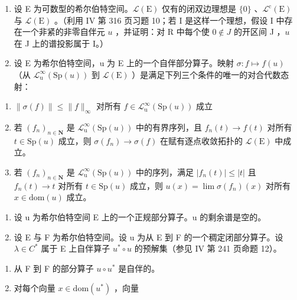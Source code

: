 \begin{enumerate}
\def\labelenumi{\arabic{enumi})}
\setcounter{enumi}{2}
\item
  设 E 为可数型的希尔伯特空间。\(\mathcal{L}(\mathrm{E})\) 仅有的闭双边理想是 \(\{0\}\) 、\(\mathcal{L}^{\mathrm{c}}(\mathrm{E})\) 与 \(\mathcal{L}(\mathrm{E})\) 。（利用 IV 第 316 页习题 10；若 I 是这样一个理想，假设 I 中存在一个非紧的非零自伴元 \(u\) ，并证明：对 R 中每个使 \(0 \notin J\) 的开区间 J ，\(u\) 在 J 上的谱投影属于 I。）
\item
  设 E 为希尔伯特空间，u 为 E 上的一个自伴部分算子。映射 \(\sigma\colon f\mapsto f(u)\) （从 \(\mathcal{L}_{\mathrm{u}}^{\infty}(\mathrm{Sp}(u))\) 到 \(\mathcal{L}(\mathrm{E})\) ）是满足下列三个条件的唯一的对合代数态射：
\end{enumerate}

\begin{enumerate}
\def\labelenumi{(\roman{enumi})}
\item
  \(\| \sigma (f)\| \leqslant \| f\|_{\infty}\) 对所有 \(f\in \mathcal{L}_{\mathrm{u}}^{\infty}(\mathrm{Sp}(u))\) 成立
\item
  若 \((f_n)_{n\in \mathbf{N}}\) 是 \(\mathcal{L}_{\mathrm{u}}^{\infty}(\mathrm{Sp}(u))\) 中的有界序列，且 \(f_{n}(t)\to f(t)\) 对所有 \(t\in \mathrm{Sp}(u)\) 成立，则 \(\sigma (f_n)\rightarrow \sigma (f)\) 在赋有逐点收敛拓扑的 \(\mathcal{L}(\mathrm{E})\) 中成立。
\item
  若 \((f_n)_{n\in \mathbf{N}}\) 是 \(\mathcal{L}_{\mathrm{u}}^{\infty}(\mathrm{Sp}(u))\) 中的序列，满足 \(|f_n(t)|\leqslant |t|\) 且 \(f_{n}(t)\to t\) 对所有 \(t\in \mathrm{Sp}(u)\) 成立，则 \(u(x) = \lim \sigma (f_n)(x)\) 对所有 \(x\in \mathrm{dom}(u)\) 成立。
\end{enumerate}

\begin{enumerate}
\def\labelenumi{\arabic{enumi})}
\setcounter{enumi}{4}
\item
  设 u 为希尔伯特空间 E 上的一个正规部分算子。u 的剩余谱是空的。
\item
  设 E 与 F 为希尔伯特空间。设 u 为从 E 到 F 的一个稠定闭部分算子。设 \(\lambda \in C^{*}\) 属于 E 上自伴算子 \(u^{*} \circ u\) 的预解集（参见 IV 第 241 页命题 12）。
\end{enumerate}

\begin{enumerate}
\def\labelenumi{\alph{enumi})}
\item
  从 F 到 F 的部分算子 \(u \circ u^{*}\) 是自伴的。
\item
  对每个向量 \(x \in \mathrm{dom}(u^{*})\) ，向量
\end{enumerate}

